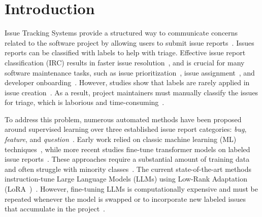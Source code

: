 
\section{Introduction}
\label{sec:01_intro}

Issue Tracking Systems provide a structured way to communicate concerns related to the software project by allowing users to submit issue reports~\cite{colavito2024leveraging}. Issues reports can be classified with labels to help with triage. Effective issue report classification (IRC) results in faster issue resolution~\cite{liao2018exploring}, and is crucial for many software maintenance tasks, such as issue prioritization~\cite{catolino2019not}, issue assignment~\cite{wu2022spatial, jeong2009improving}, and developer onboarding~\cite{santos2023tag, steinmacher2018let, aracena2025applying}. However, studies show that labels are rarely applied in issue creation~\cite{antoniol2008bug, herzig2013s, cabot2015exploring, kallis2019ticket}. As a result, project maintainers must manually classify the issues for triage, which is laborious and time-consuming~\cite{fan2017road}. 

To address this problem, numerous automated methods have been proposed around supervised learning over three established issue report categories: \emph{bug}, \emph{feature}, and \emph{question}~\cite{antoniol2008bug, kallis2019ticket, izadi2022catiss, aracena2025applying, aracena2024applyinglargelanguagemodels}. Early work relied on classic machine learning (ML) techniques~\cite{antoniol2008bug, kallis2019ticket, fan2017road, herzig2013s}, while more recent studies fine-tune transformer models on labeled issue reports~\cite{izadi2022catiss, izadi2022predicting, trautsch2022predicting, bharadwaj2022github, colavito2022issue, wang2021well, gomes2023bert}. These approaches require a substantial amount of training data and often struggle with minority classes~\cite{izadi2022catiss, izadi2022predicting, colavito2022issue, heo2025study, vargovich2023givemelabeledissues}. The current state-of-the-art methods instruction-tune Large Language Models (LLMs) using Low-Rank Adaptation (LoRA~\cite{hu2022lora})~\cite{heo2025study, aracena2025applying, aracena2024applyinglargelanguagemodels}. However, fine-tuning LLMs is computationally expensive and must be repeated whenever the model is swapped or to incorporate new labeled issues that accumulate in the project~\cite{fan2017road, kallis2019ticket}.


